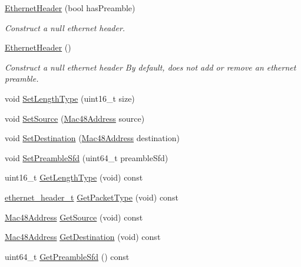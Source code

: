 \begin{DoxyCompactItemize}
\item 
\hyperlink{classns3_1_1EthernetHeader_a9a566832b43ba36fcdf9551c9c1af879}{Ethernet\+Header} (bool has\+Preamble)
\begin{DoxyCompactList}\small\item\em Construct a null ethernet header. \end{DoxyCompactList}\item 
\hyperlink{classns3_1_1EthernetHeader_a86ede98d4db4791438dc87da74bb6609}{Ethernet\+Header} ()
\begin{DoxyCompactList}\small\item\em Construct a null ethernet header By default, does not add or remove an ethernet preamble. \end{DoxyCompactList}\item 
void \hyperlink{classns3_1_1EthernetHeader_a765c4746c32e8b4cb6bf17eb76507f27}{Set\+Length\+Type} (uint16\+\_\+t size)
\item 
void \hyperlink{classns3_1_1EthernetHeader_a78092e407054c05aa43ae95354988563}{Set\+Source} (\hyperlink{classns3_1_1Mac48Address}{Mac48\+Address} source)
\item 
void \hyperlink{classns3_1_1EthernetHeader_a40b1459c54c1f92240899c58c0a7a447}{Set\+Destination} (\hyperlink{classns3_1_1Mac48Address}{Mac48\+Address} destination)
\item 
void \hyperlink{classns3_1_1EthernetHeader_ab40159af90e38d20b809e80c9e7568dd}{Set\+Preamble\+Sfd} (uint64\+\_\+t preamble\+Sfd)
\item 
uint16\+\_\+t \hyperlink{classns3_1_1EthernetHeader_a13dbc4a772d8abbffa4ca1ef1894d07d}{Get\+Length\+Type} (void) const 
\item 
\hyperlink{namespacens3_a484a51f28861c3bf08c3755eca402c4b}{ethernet\+\_\+header\+\_\+t} \hyperlink{classns3_1_1EthernetHeader_a0fca361bed0d2c03939530d7e7b5d287}{Get\+Packet\+Type} (void) const 
\item 
\hyperlink{classns3_1_1Mac48Address}{Mac48\+Address} \hyperlink{classns3_1_1EthernetHeader_a72be6e9e1671ebf57336ace7725c3928}{Get\+Source} (void) const 
\item 
\hyperlink{classns3_1_1Mac48Address}{Mac48\+Address} \hyperlink{classns3_1_1EthernetHeader_a2383c4f482101a0e2ebe8a4e9e62f64a}{Get\+Destination} (void) const 
\item 
uint64\+\_\+t \hyperlink{classns3_1_1EthernetHeader_af8061e2b8f3186b7728d3165393105b7}{Get\+Preamble\+Sfd} () const 
\item 

\end{DoxyCompactItemize}
